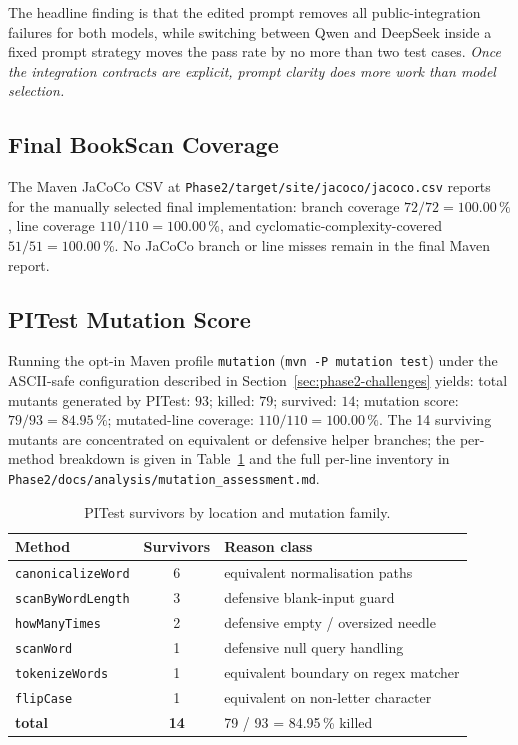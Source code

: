 \documentclass[journal]{IEEEtran}
\begin{document}
The headline finding is that the edited prompt removes all
public-integration failures for both models, while switching between
Qwen and DeepSeek inside a fixed prompt strategy moves the pass rate by
no more than two test cases. \emph{Once the integration contracts are
explicit, prompt clarity does more work than model selection.}

\subsection{Final BookScan Coverage}

The Maven JaCoCo CSV at \texttt{Phase2/target/site/jacoco/jacoco.csv}
reports for the manually selected final implementation: branch coverage
$72/72=100.00\,\%$, line coverage $110/110=100.00\,\%$, and
cyclomatic-complexity-covered $51/51=100.00\,\%$. No JaCoCo branch or
line misses remain in the final Maven report.

\subsection{PITest Mutation Score}

Running the opt-in Maven profile \texttt{mutation}
(\texttt{mvn -P mutation test}) under the ASCII-safe configuration
described in Section~\ref{sec:phase2-challenges} yields:
total mutants generated by PITest: $93$;
killed: $79$; survived: $14$; mutation score: $79/93=84.95\,\%$;
mutated-line coverage: $110/110=100.00\,\%$. The 14 surviving mutants are
concentrated on equivalent or defensive helper branches; the per-method
breakdown is given in Table~\ref{tab:pit-survivors} and the full per-line
inventory in \texttt{Phase2/docs/analysis/mutation\_assessment.md}.

\begin{table}[!t]
\renewcommand{\arraystretch}{1.15}
\caption{PITest survivors by location and mutation family.}
\label{tab:pit-survivors}
\centering
\footnotesize
\begin{tabular}{@{}lcl@{}}
\toprule
\textbf{Method} & \textbf{Survivors} & \textbf{Reason class} \\
\midrule
\texttt{canonicalizeWord}    & 6 & equivalent normalisation paths \\
\texttt{scanByWordLength}    & 3 & defensive blank-input guard \\
\texttt{howManyTimes}        & 2 & defensive empty / oversized needle \\
\texttt{scanWord}            & 1 & defensive null query handling \\
\texttt{tokenizeWords}       & 1 & equivalent boundary on regex matcher \\
\texttt{flipCase}            & 1 & equivalent on non-letter character \\
\midrule
\textbf{total}               & \textbf{14} & 79 / 93 = 84.95\,\% killed \\
\bottomrule
\end{tabular}
\end{table}
\end{document}
